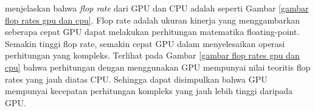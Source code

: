 \cite{oanceaGPGPUComputing2014} menjelaskan bahwa \emph{flop rate} dari GPU dan CPU
adalah seperti Gambar \ref{gambar flop rates gpu dan cpu}. Flop rate adalah
ukuran kinerja yang menggambarkan seberapa cepat GPU dapat melakukan perhitungan
matematika floating-point. Semakin tinggi flop rate, semakin cepat GPU dalam
menyelesaikan operasi perhitungan yang kompleks. Terlihat pada Gambar \ref{gambar
flop rates gpu dan cpu} bahwa perhitungan dengan menggunakan GPU mempunyai nilai
teoritis flop rates yang jauh diatas CPU. Sehingga dapat disimpulkan bahwa GPU
mempunyai kecepatan perhitungan kompleks yang jauh lebih tinggi daripada GPU.






